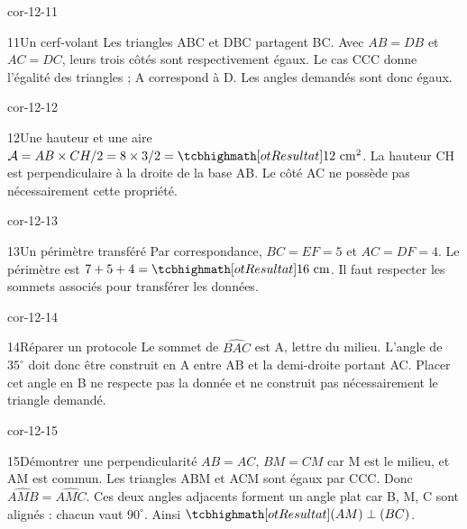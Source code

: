 \begin{blocLivre}{cor-12-11}\begin{corrige}{11}{Un cerf-volant}
Les triangles ABC et DBC partagent BC. Avec $AB=DB$ et $AC=DC$, leurs trois côtés sont respectivement égaux. Le cas CCC donne l’égalité des triangles ; A correspond à D. Les angles demandés sont donc égaux.
\label{fig-cor-12-11}
\end{corrige}\end{blocLivre}
\begin{blocLivre}{cor-12-12}\begin{corrige}{12}{Une hauteur et une aire}
$\mathcal A=AB\times CH/2=8\times3/2=\res{12\ \mathrm{cm}^2}$. La hauteur CH est perpendiculaire à la droite de la base AB. Le côté AC ne possède pas nécessairement cette propriété.
\label{fig-cor-12-12}
\end{corrige}\end{blocLivre}
\begin{blocLivre}{cor-12-13}\begin{corrige}{13}{Un périmètre transféré}
Par correspondance, $BC=EF=5$ et $AC=DF=4$. Le périmètre est $7+5+4=\res{16\ \mathrm{cm}}$. Il faut respecter les sommets associés pour transférer les données.
\label{fig-cor-12-13}
\end{corrige}\end{blocLivre}
\begin{blocLivre}{cor-12-14}\begin{corrige}{14}{Réparer un protocole}
Le sommet de $\widehat{BAC}$ est A, lettre du milieu. L’angle de $35^\circ$ doit donc être construit en A entre AB et la demi-droite portant AC. Placer cet angle en B ne respecte pas la donnée et ne construit pas nécessairement le triangle demandé.
\label{fig-cor-12-14}
\end{corrige}\end{blocLivre}
\begin{blocLivre}{cor-12-15}\begin{corrige}{15}{Démontrer une perpendicularité}
$AB=AC$, $BM=CM$ car M est le milieu, et AM est commun. Les triangles ABM et ACM sont égaux par CCC. Donc $\widehat{AMB}=\widehat{AMC}$. Ces deux angles adjacents forment un angle plat car B, M, C sont alignés : chacun vaut $90^\circ$. Ainsi $\res{(AM)\perp(BC)}$.
\label{fig-cor-12-15}
\end{corrige}\end{blocLivre}
